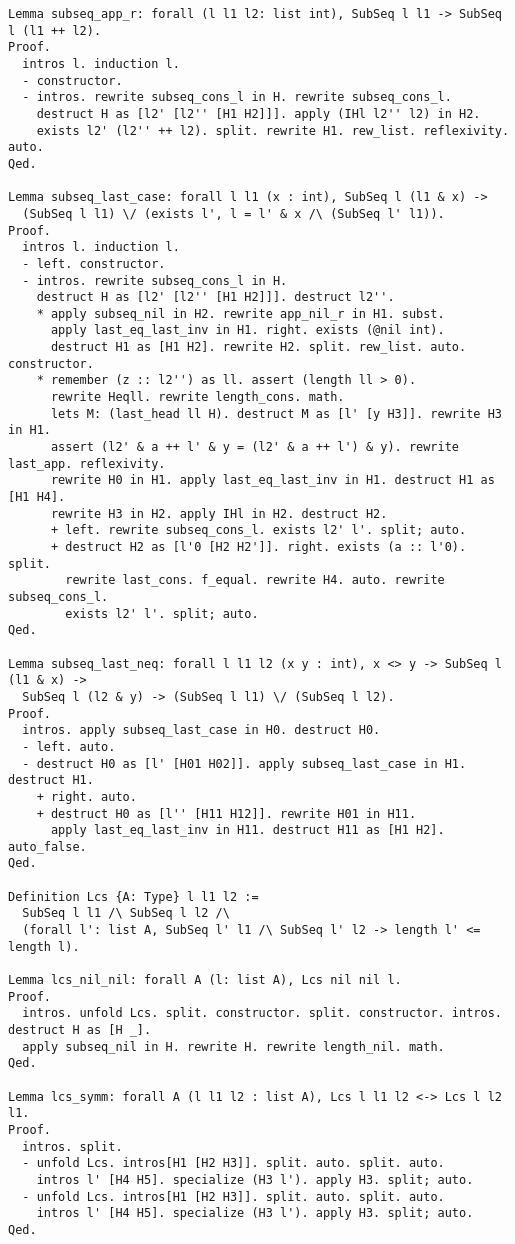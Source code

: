 \begin{verbatim}
Lemma subseq_app_r: forall (l l1 l2: list int), SubSeq l l1 -> SubSeq l (l1 ++ l2). 
Proof.
  intros l. induction l. 
  - constructor. 
  - intros. rewrite subseq_cons_l in H. rewrite subseq_cons_l. 
    destruct H as [l2' [l2'' [H1 H2]]]. apply (IHl l2'' l2) in H2. 
    exists l2' (l2'' ++ l2). split. rewrite H1. rew_list. reflexivity. auto. 
Qed.

Lemma subseq_last_case: forall l l1 (x : int), SubSeq l (l1 & x) ->
  (SubSeq l l1) \/ (exists l', l = l' & x /\ (SubSeq l' l1)). 
Proof.
  intros l. induction l. 
  - left. constructor. 
  - intros. rewrite subseq_cons_l in H. 
    destruct H as [l2' [l2'' [H1 H2]]]. destruct l2''. 
    * apply subseq_nil in H2. rewrite app_nil_r in H1. subst. 
      apply last_eq_last_inv in H1. right. exists (@nil int). 
      destruct H1 as [H1 H2]. rewrite H2. split. rew_list. auto. constructor. 
    * remember (z :: l2'') as ll. assert (length ll > 0). 
      rewrite Heqll. rewrite length_cons. math. 
      lets M: (last_head ll H). destruct M as [l' [y H3]]. rewrite H3 in H1. 
      assert (l2' & a ++ l' & y = (l2' & a ++ l') & y). rewrite last_app. reflexivity. 
      rewrite H0 in H1. apply last_eq_last_inv in H1. destruct H1 as [H1 H4]. 
      rewrite H3 in H2. apply IHl in H2. destruct H2. 
      + left. rewrite subseq_cons_l. exists l2' l'. split; auto. 
      + destruct H2 as [l'0 [H2 H2']]. right. exists (a :: l'0). split. 
        rewrite last_cons. f_equal. rewrite H4. auto. rewrite subseq_cons_l. 
        exists l2' l'. split; auto. 
Qed.

Lemma subseq_last_neq: forall l l1 l2 (x y : int), x <> y -> SubSeq l (l1 & x) -> 
  SubSeq l (l2 & y) -> (SubSeq l l1) \/ (SubSeq l l2). 
Proof.
  intros. apply subseq_last_case in H0. destruct H0. 
  - left. auto. 
  - destruct H0 as [l' [H01 H02]]. apply subseq_last_case in H1. destruct H1. 
    + right. auto. 
    + destruct H0 as [l'' [H11 H12]]. rewrite H01 in H11. 
      apply last_eq_last_inv in H11. destruct H11 as [H1 H2]. auto_false. 
Qed.

Definition Lcs {A: Type} l l1 l2 :=
  SubSeq l l1 /\ SubSeq l l2 /\ 
  (forall l': list A, SubSeq l' l1 /\ SubSeq l' l2 -> length l' <= length l). 

Lemma lcs_nil_nil: forall A (l: list A), Lcs nil nil l. 
Proof.
  intros. unfold Lcs. split. constructor. split. constructor. intros. destruct H as [H _]. 
  apply subseq_nil in H. rewrite H. rewrite length_nil. math. 
Qed.

Lemma lcs_symm: forall A (l l1 l2 : list A), Lcs l l1 l2 <-> Lcs l l2 l1. 
Proof.
  intros. split. 
  - unfold Lcs. intros[H1 [H2 H3]]. split. auto. split. auto. 
    intros l' [H4 H5]. specialize (H3 l'). apply H3. split; auto.
  - unfold Lcs. intros[H1 [H2 H3]]. split. auto. split. auto. 
    intros l' [H4 H5]. specialize (H3 l'). apply H3. split; auto. 
Qed.


\end{verbatim}
